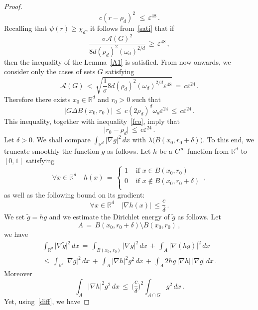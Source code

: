 \documentclass[10pt]{amsart}
\theoremstyle{definition}\newtheorem{defi}[theo]{Definition}\newtheorem{rema}[theo]{Remark}\newtheorem{exam}[theo]{Example}\newtheorem{exem}[theo]{Example}\newtheorem{nota}[theo]{Notation}
\newcommand*\Rd {{\mathbb R^d}}
\newcommand*\R{\mathbb{R}}
\newcommand*\gt{\widetilde g}
\newcommand{\cA}{\mathcal{A}}
\let\oldforall\forall
\renewcommand*{\forall}{\mathrel{\oldforall}}
\begin{document}
\begin{proof}
\begin{equation}\label{fco}
c(r-\rho_d)^2\,\,\leq\,\varepsilon^{48}\,.
\end{equation}
Recalling that $\psi(r)\geq\chi_d$, it follows from~\eqref{sati} that if
\[
\frac{\sigma\cA(G)^2}{8d(\rho_d)^{2}(\omega_d)^{2/d}}
\,\geq\,\varepsilon^{48}\,,
\]
then the inequality of the Lemma~\ref{A1} is satisfied. From now onwards, we consider only the cases of sets $G$ satisfying
\begin{equation}\label{sata}
{\cA(G)}
\,<\,
\sqrt{\frac{1}{\sigma}{8d(\rho_d)^{2}(\omega_d)^{2/d}}\varepsilon^{48}}\,=\, c\varepsilon^{24}\,.
\end{equation}
Therefore there exists $x_0\in\Rd$ and $r_0>0$ such that
\begin{equation}\label{diff}
\big|G\Delta B(x_0,r_0)\big|\,\leq\, c (2\rho_d)^d\omega_d
\varepsilon^{24}
\,\leq\, c\varepsilon^{24}
\,.
\end{equation}
This inequality, together with inequality~\eqref{fco}, imply that
\begin{equation}\label{adiff}
\big|r_0-\rho_d\big|\,\leq\, c\varepsilon^{24}
\,.
\end{equation}
Let $\delta>0$. We shall compare $\int_{\Rd}\big|\nabla g\big|^2\,dx$ with $\lambda\big({B(x_0,r_0+\delta)}\big)$. To this end, we truncate smoothly the function $g$ as follows. Let $h$ be a $C^\infty$ function from $\R^d$ to $[0,1]$ satisfying
\[
\forall x\in\Rd\quad
h(x)\,=\,
\begin{cases}
1 & \text{ if }x\in B(x_0,r_0)\\ 0 & \text{ if }x\not\in B(x_0,r_0+\delta)\\
\end{cases}\,,
\]
as well as the following bound on its gradient:
\[
\forall x\in\Rd\quad
\big|\nabla h(x)\big|\,\leq\frac{c}{\delta}\,.
\]
We set $\gt=hg$ and we estimate the Dirichlet energy of $\gt$ as follows. Let
\[
A\,=\,B(x_0,r_0+\delta)\setminus B(x_0,r_0)\,,
\]
we have
\begin{multline}\label{kold}
\int_{\Rd}\big|\nabla \gt\big|^2\,dx\,=\,
\int_{B(x_0,\,r_0)}\big|\nabla g\big|^2\,dx\,+\,
\int_{A}\big|\nabla (hg)\big|^2\,dx\,\\
\leq\,
\int_{\Rd}\big|\nabla g\big|^2\,dx\,+\,
\int_{A}\big|\nabla h\big|^2g^2\,dx\,+\,
\int_{A}2hg \,
\big|\nabla h\big|\,
\big|\nabla g\big|\,dx\,.
\end{multline}
Moreover
\[
\int_{A}\big|\nabla h\big|^2g^2\,dx
\,\leq\,
\Big(\frac{c}{\delta}\Big)^2
\int_{A\cap G}g^2\,dx\,.
\]
Yet, using~\eqref{diff}, we have

\end{proof}
\end{document}
